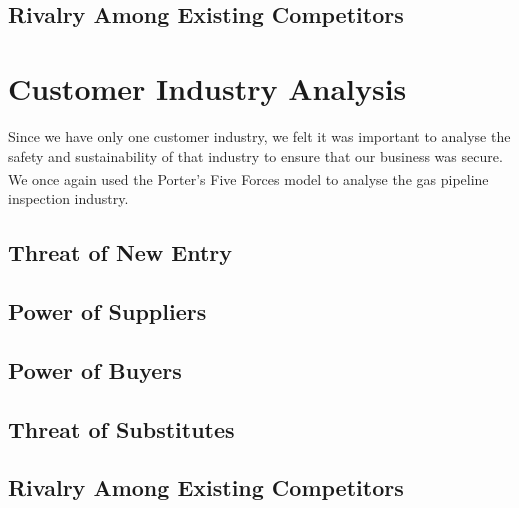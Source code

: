 \documentclass[11pt]{article}		%
\begin{document}
		\subsection[Rivalry Among Existing Competitors]{Rivalry Among Existing Competitors}
		
	\section{Customer Industry Analysis}
		Since we have only one customer industry, we felt it was important to analyse the safety and sustainability of that industry to ensure that our business was secure.
		We once again used the Porter's Five Forces model\textsuperscript{\cite{porter2008five}} to analyse the gas pipeline inspection industry.
			
		\subsection[Threat of Entry]{Threat of New Entry}
				
		\subsection[Power of Suppliers]{Power of Suppliers}
		
		\subsection[Power of Buyers]{Power of Buyers}
		
		\subsection[Threat of Substitutes]{Threat of Substitutes}
			
			
		
		\subsection[Rivalry Among Existing Competitors]{Rivalry Among Existing Competitors}
	
	\pagebreak		%
	
	
\end{document}
